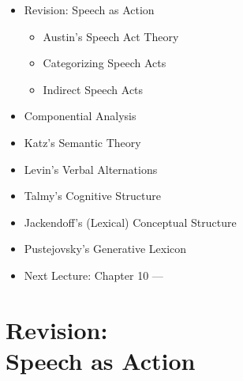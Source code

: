\documentclass[headrule,footrule]{foils}
\begin{document}
\maketitle

%

\begin{itemize}\addtolength{\itemsep}{-1ex}
\item Revision: Speech as Action
  \begin{itemize}
  \item Austin's Speech Act Theory
  \item Categorizing Speech Acts
  \item Indirect Speech Acts
  \end{itemize}
\item Componential Analysis
\item Katz's Semantic Theory
\item Levin's Verbal Alternations
\item Talmy's Cognitive Structure
\item Jackendoff's (Lexical) Conceptual Structure
\item Pustejovsky's Generative Lexicon
\item Next Lecture: Chapter 10 --- 
\end{itemize}



\MyLogo{}



\section{Revision: \\ Speech as Action}


\end{document}
